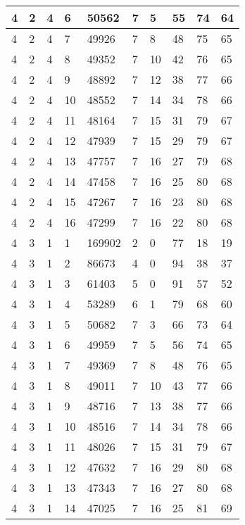 \begin{table}[!ht]
\begin{tabular}{|l|l|l|l|l|l|l|l|l|l|}
        4 & 2 & 4 & 6 & 50562 & 7 & 5 & 55 & 74 & 64 \\ \hline
        4 & 2 & 4 & 7 & 49926 & 7 & 8 & 48 & 75 & 65 \\ \hline
        4 & 2 & 4 & 8 & 49352 & 7 & 10 & 42 & 76 & 65 \\ \hline
        4 & 2 & 4 & 9 & 48892 & 7 & 12 & 38 & 77 & 66 \\ \hline
        4 & 2 & 4 & 10 & 48552 & 7 & 14 & 34 & 78 & 66 \\ \hline
        4 & 2 & 4 & 11 & 48164 & 7 & 15 & 31 & 79 & 67 \\ \hline
        4 & 2 & 4 & 12 & 47939 & 7 & 15 & 29 & 79 & 67 \\ \hline
        4 & 2 & 4 & 13 & 47757 & 7 & 16 & 27 & 79 & 68 \\ \hline
        4 & 2 & 4 & 14 & 47458 & 7 & 16 & 25 & 80 & 68 \\ \hline
        4 & 2 & 4 & 15 & 47267 & 7 & 16 & 23 & 80 & 68 \\ \hline
        4 & 2 & 4 & 16 & 47299 & 7 & 16 & 22 & 80 & 68 \\ \hline
        4 & 3 & 1 & 1 & 169902 & 2 & 0 & 77 & 18 & 19 \\ \hline
        4 & 3 & 1 & 2 & 86673 & 4 & 0 & 94 & 38 & 37 \\ \hline
        4 & 3 & 1 & 3 & 61403 & 5 & 0 & 91 & 57 & 52 \\ \hline
        4 & 3 & 1 & 4 & 53289 & 6 & 1 & 79 & 68 & 60 \\ \hline
        4 & 3 & 1 & 5 & 50682 & 7 & 3 & 66 & 73 & 64 \\ \hline
        4 & 3 & 1 & 6 & 49959 & 7 & 5 & 56 & 74 & 65 \\ \hline
        4 & 3 & 1 & 7 & 49369 & 7 & 8 & 48 & 76 & 65 \\ \hline
        4 & 3 & 1 & 8 & 49011 & 7 & 10 & 43 & 77 & 66 \\ \hline
        4 & 3 & 1 & 9 & 48716 & 7 & 13 & 38 & 77 & 66 \\ \hline
        4 & 3 & 1 & 10 & 48516 & 7 & 14 & 34 & 78 & 66 \\ \hline
        4 & 3 & 1 & 11 & 48026 & 7 & 15 & 31 & 79 & 67 \\ \hline
        4 & 3 & 1 & 12 & 47632 & 7 & 16 & 29 & 80 & 68 \\ \hline
        4 & 3 & 1 & 13 & 47343 & 7 & 16 & 27 & 80 & 68 \\ \hline
        4 & 3 & 1 & 14 & 47025 & 7 & 16 & 25 & 81 & 69 \\ \hline

\end{tabular}
\end{table}
